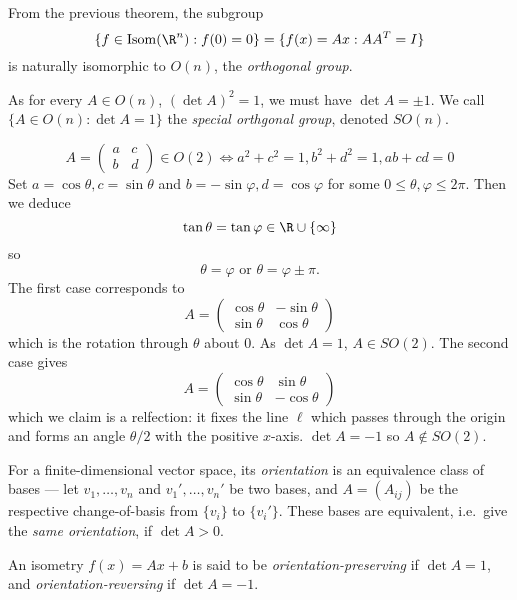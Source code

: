 \documentclass[a4paper]{article}
\theoremstyle{definition}
\DeclareMathOperator{\Isom}{Isom}
\begin{document}
From the previous theorem, the subgroup
\[
  \{f \in \Isom(\R^n): f(0) = 0\} = \{f(x) = Ax: AA^T = I\}
\]
is naturally isomorphic to \(O(n)\), the \emph{orthogonal group}.

As for every \(A \in O(n)\), \((\det A)^2 = 1\), we must have \(\det A = \pm 1\). We call \(\{A \in O(n): \det A = 1\}\) the \emph{special orthgonal group}, denoted \(SO(n)\).

\begin{eg}[\(O(2)\)]
  \[
    A =
    \begin{pmatrix}
      a & c \\
      b & d
    \end{pmatrix}
    \in O(2) \Leftrightarrow a^2 + c^2 = 1, b^2 + d^2 = 1, ab + cd = 0
  \]
  Set \(a = \cos \theta, c = \sin \theta\) and \(b = - \sin \varphi, d = \cos \varphi\) for some \(0 \leq \theta, \varphi \leq 2\pi\). Then we deduce
  \[
    \tan \theta = \tan \varphi \in \R \cup \{\infty\}
  \]
  so
  \[
    \theta = \varphi \text{ or } \theta = \varphi \pm \pi.
  \]
  The first case corresponds to
  \[
    A =
    \begin{pmatrix}
      \cos \theta & -\sin \theta \\
      \sin \theta & \cos \theta
    \end{pmatrix}
  \]
  which is the rotation through \(\theta\) about \(0\). As \(\det A = 1\), \(A \in SO(2)\). The second case gives
  \[
    A =
    \begin{pmatrix}
      \cos \theta & \sin \theta \\
      \sin \theta & - \cos \theta
    \end{pmatrix}
  \]
  which we claim is a relfection: it fixes the line \(\ell\) which passes through the origin and forms an angle \(\theta/2\) with the positive \(x\)-axis. \(\det A = -1\) so \(A \notin SO(2)\).
\end{eg}

\begin{remark}[Orientation]
  For a finite-dimensional vector space, its \emph{orientation} is an equivalence class of bases --- let \(v_1, \dots, v_n\) and \(v_1', \dots, v_n'\) be two bases, and \(A = (A_{ij})\) be the respective change-of-basis from \(\{v_i\}\) to \(\{v_i'\}\). These bases are equivalent, i.e.\ give the \emph{same orientation}, if \(\det A > 0\).
\end{remark}

\begin{definition}
  An isometry \(f(x) = Ax + b\) is said to be \emph{orientation-preserving} if \(\det A = 1\), and \emph{orientation-reversing} if \(\det A = -1\).
\end{definition}
\end{document}
